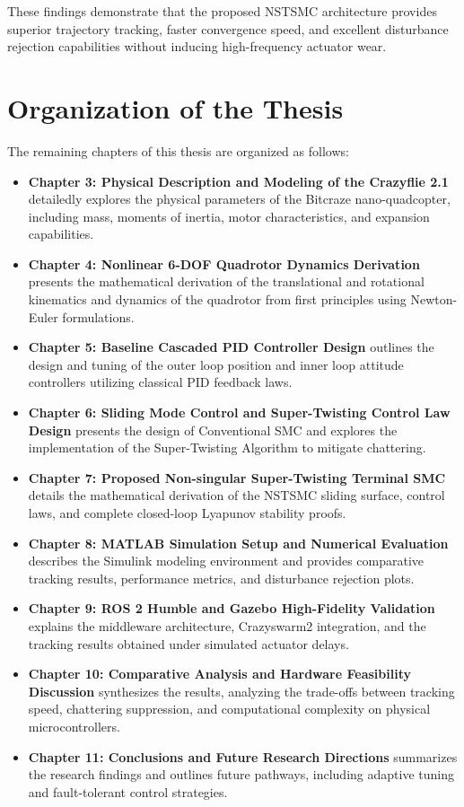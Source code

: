 These findings demonstrate that the proposed NSTSMC architecture provides superior trajectory tracking, faster convergence speed, and excellent disturbance rejection capabilities without inducing high-frequency actuator wear.

\section{Organization of the Thesis}
The remaining chapters of this thesis are organized as follows:
\begin{itemize}
    \item \textbf{Chapter 3: Physical Description and Modeling of the Crazyflie 2.1} detailedly explores the physical parameters of the Bitcraze nano-quadcopter, including mass, moments of inertia, motor characteristics, and expansion capabilities.
    \item \textbf{Chapter 4: Nonlinear 6-DOF Quadrotor Dynamics Derivation} presents the mathematical derivation of the translational and rotational kinematics and dynamics of the quadrotor from first principles using Newton-Euler formulations.
    \item \textbf{Chapter 5: Baseline Cascaded PID Controller Design} outlines the design and tuning of the outer loop position and inner loop attitude controllers utilizing classical PID feedback laws.
    \item \textbf{Chapter 6: Sliding Mode Control and Super-Twisting Control Law Design} presents the design of Conventional SMC and explores the implementation of the Super-Twisting Algorithm to mitigate chattering.
    \item \textbf{Chapter 7: Proposed Non-singular Super-Twisting Terminal SMC} details the mathematical derivation of the NSTSMC sliding surface, control laws, and complete closed-loop Lyapunov stability proofs.
    \item \textbf{Chapter 8: MATLAB Simulation Setup and Numerical Evaluation} describes the Simulink modeling environment and provides comparative tracking results, performance metrics, and disturbance rejection plots.
    \item \textbf{Chapter 9: ROS 2 Humble and Gazebo High-Fidelity Validation} explains the middleware architecture, Crazyswarm2 integration, and the tracking results obtained under simulated actuator delays.
    \item \textbf{Chapter 10: Comparative Analysis and Hardware Feasibility Discussion} synthesizes the results, analyzing the trade-offs between tracking speed, chattering suppression, and computational complexity on physical microcontrollers.
    \item \textbf{Chapter 11: Conclusions and Future Research Directions} summarizes the research findings and outlines future pathways, including adaptive tuning and fault-tolerant control strategies.
\end{itemize}

